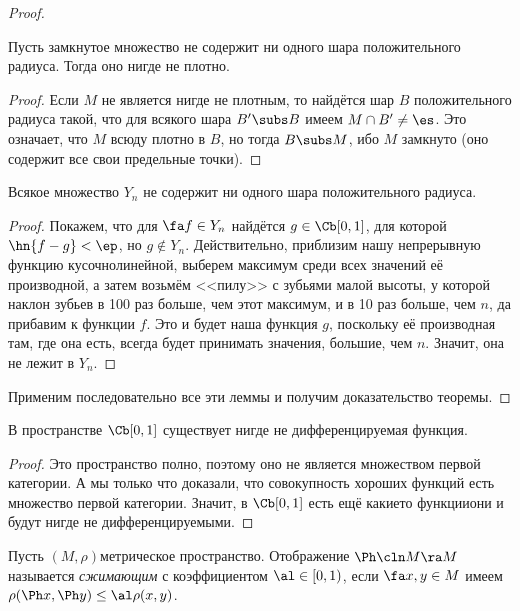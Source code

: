 \documentclass[a4paper]{article}
\begin{document}
\begin{proof}
\begin{lemma}\label{lemma:cl.wo.balls.hence.nondense}
Пусть замкнутое множество не содержит ни одного шара положительного радиуса.
Тогда оно нигде не плотно.
\end{lemma}
\begin{proof}
Если $M$ не является нигде не плотным, то найдётся шар $B$ положительного радиуса
такой, что для всякого шара $B' \subs B$ имеем $M \cap B' \neq \es$. Это означает,
что $M$ всюду плотно в $B$, но тогда $B \subs M$,
ибо $M$ замкнуто (оно содержит все свои предельные точки).
\end{proof}

\begin{lemma}
Всякое множество $Y_n$ не содержит ни одного шара положительного радиуса.
\end{lemma}
\begin{proof}
Покажем, что для $\fa f \in Y_n$ найдётся $g \in \Cb[0,1]$, для которой
$\hn{f-g} < \ep$, но $g \notin Y_n$. Действительно, приблизим нашу непрерывную функцию
кусочно\д линейной, выберем максимум среди всех значений её производной, а затем возьмём
<<пилу>> с зубьями малой высоты, у которой наклон зубьев в 100 раз больше,
чем этот максимум, и в 10 раз больше, чем $n$, да прибавим к функции $f$.
Это и будет наша функция $g$, поскольку её производная там, где она есть, всегда будет
принимать значения, большие, чем $n$. Значит, она не лежит в $Y_n$.
\end{proof}

Применим последовательно все эти леммы и получим доказательство теоремы.
\end{proof}

\begin{imp}
В пространстве $\Cb[0,1]$ существует нигде не дифференцируемая функция.
\end{imp}
\begin{proof}
Это пространство полно, поэтому оно не является множеством первой категории.
А мы только что доказали, что совокупность хороших функций есть множество первой категории.
Значит, в $\Cb[0,1]$ есть ещё какие\д то функции\т они и будут нигде не дифференцируемыми.
\end{proof}


\begin{df}
Пусть $(M, \rho)$\т метрическое пространство.
Отображение $\Ph\cln M\ra M$ называется \emph{сжимающим} с коэффициентом $\al \in [0,1)$, если $\fa x, y \in M$
имеем $\rho(\Ph x, \Ph y) \le \al \rho(x,y)$.
\end{df}
\end{document}
